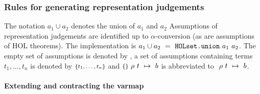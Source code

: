 \subsubsection{Rules for generating representation judgements}\label{term-bdd-rules}

The notation $a_1 \cup a_2$ denotes the union of $a_1$ and $a_2$ 
Assumptions of
representation judgements are identified up to $\alpha$-conversion (as
are assumptions of HOL theorems).
The implementation is $a_1 \cup a_2~=~\mbox{\tt HOLset.union}~a_1~a_2$. 
The empty set of assumptions is denoted by \emptyass, a set of
assumptions containing terms $t_1, \ldots ,t_n$ is denoted by
$\mbox{\footnotesize$\{t_1, \ldots ,t_n\}$}{}$  and 
$\mbox{$\mbox{\footnotesize$\{{}\}$}{}~\rho~t~\mapsto~b$}$ is abbreviated to
$\mbox{$~\rho~t~\mapsto~b$}$.


\paragraph{Extending and contracting the varmap} {\(\)}\\  

\newsavebox\BddExtendVarmap
{}
\fbox{\usebox{\BddExtendVarmap}}

